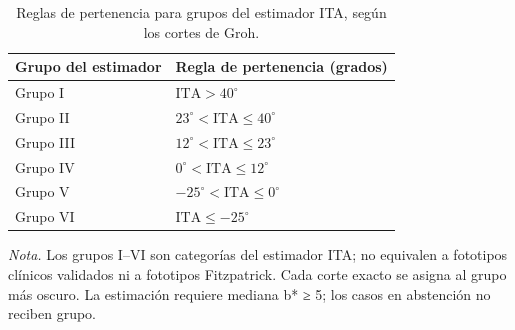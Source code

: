 \begin{table}[htbp]
\centering
\caption{Reglas de pertenencia para grupos del estimador ITA, según los cortes de Groh.}
\label{tab:ita-estimator-intervals}
\begin{tabular}{ll}
\hline
Grupo del estimador & Regla de pertenencia (grados) \\
\hline
Grupo I & $\mathrm{ITA} > 40^\circ$ \\
Grupo II & $23^\circ < \mathrm{ITA} \le 40^\circ$ \\
Grupo III & $12^\circ < \mathrm{ITA} \le 23^\circ$ \\
Grupo IV & $0^\circ < \mathrm{ITA} \le 12^\circ$ \\
Grupo V & $-25^\circ < \mathrm{ITA} \le 0^\circ$ \\
Grupo VI & $\mathrm{ITA} \le -25^\circ$ \\
\hline
\end{tabular}
\par\smallskip
\begin{minipage}{0.94\linewidth}
\footnotesize \textit{Nota.} Los grupos I–VI son categorías del estimador ITA; no equivalen a fototipos clínicos validados ni a fototipos Fitzpatrick. Cada corte exacto se asigna al grupo más oscuro. La estimación requiere mediana b* ≥ 5; los casos en abstención no reciben grupo.
\end{minipage}
\end{table}
